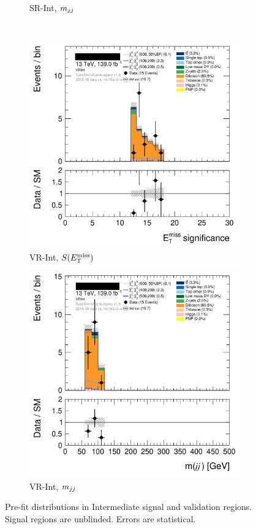 \begin{figure}[tp]
\begin{subfigure}{0.48\textwidth}
\caption{SR-Int, $m_{jj}$}
\end{subfigure}
\\[0.5em]
\begin{subfigure}{0.48\textwidth}
\centering
\includegraphics[width=\textwidth]{figures/2ljets_def_met_Sign_VRInt.png}
\caption{VR-Int, $S(E_\mathrm{T}^\mathrm{miss})$}
\end{subfigure}
\hfill
\begin{subfigure}{0.48\textwidth}
\centering
\includegraphics[width=\textwidth]{figures/2ljets_def_mjj_VRInt.png}
\caption{VR-Int, $m_{jj}$}
\end{subfigure}
\caption[
Pre-fit distributions in Intermediate signal and validation regions
]{%
Pre-fit distributions in Intermediate signal and validation regions.
Signal regions are unblinded.
Errors are statistical.
}
\label{fig:2ljets_int_region}
\end{figure}

